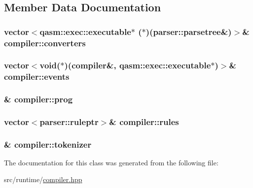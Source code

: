 \subsection{Member Data Documentation}
\subsubsection[{\texorpdfstring{converters}{converters}}]{\setlength{\rightskip}{0pt plus 5cm}vector$<${\bf qasm\+::exec\+::executable}$\ast$ ($\ast$)({\bf parser\+::parsetree}\&)$>$\& compiler\+::converters}\hypertarget{classcompiler_a76cbb22ce5238f2fd9b3946f541dba0c}{}\label{classcompiler_a76cbb22ce5238f2fd9b3946f541dba0c}
\subsubsection[{\texorpdfstring{events}{events}}]{\setlength{\rightskip}{0pt plus 5cm}vector$<$void($\ast$)({\bf compiler}\&, {\bf qasm\+::exec\+::executable}$\ast$)$>$\& compiler\+::events}\hypertarget{classcompiler_aa9d1b362adff0ca48511cf824ca1fe4c}{}\label{classcompiler_aa9d1b362adff0ca48511cf824ca1fe4c}
\subsubsection[{\texorpdfstring{prog}{prog}}]{\& compiler\+::prog}\hypertarget{classcompiler_a801700690bf711169679cb6ca890168a}{}\label{classcompiler_a801700690bf711169679cb6ca890168a}
\subsubsection[{\texorpdfstring{rules}{rules}}]{\setlength{\rightskip}{0pt plus 5cm}vector$<${\bf parser\+::ruleptr}$>$\& compiler\+::rules}\hypertarget{classcompiler_a1b712963929882f359df919ce73bbf4e}{}\label{classcompiler_a1b712963929882f359df919ce73bbf4e}
\subsubsection[{\texorpdfstring{tokenizer}{tokenizer}}]{\& compiler\+::tokenizer}\hypertarget{classcompiler_a888ac16dbb82fa8a9500633addcd22ba}{}\label{classcompiler_a888ac16dbb82fa8a9500633addcd22ba}


The documentation for this class was generated from the following file\+:\begin{DoxyCompactItemize}
\item 
src/runtime/\hyperlink{compiler_8hpp}{compiler.\+hpp}\end{DoxyCompactItemize}
